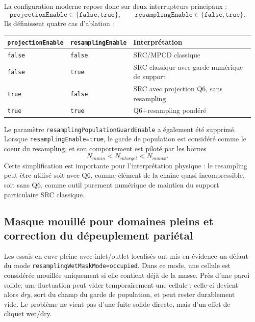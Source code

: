 \documentclass[11pt,a4paper]{article}
\begin{document}
La configuration moderne repose donc sur deux interrupteurs principaux :
\begin{equation}
  \texttt{projectionEnable}\in\{\texttt{false},\texttt{true}\},
  \qquad
  \texttt{resamplingEnable}\in\{\texttt{false},\texttt{true}\}.
\end{equation}
Ils définissent quatre cas d'ablation :
\begin{center}
\begin{tabular}{lll}
\toprule
\texttt{projectionEnable} & \texttt{resamplingEnable} & Interprétation \\
\midrule
\texttt{false} & \texttt{false} & SRC/MPCD classique \\
\texttt{false} & \texttt{true}  & SRC classique avec garde numérique de support \\
\texttt{true}  & \texttt{false} & SRC avec projection Q6, sans resampling \\
\texttt{true}  & \texttt{true}  & Q6+resampling pondéré \\
\bottomrule
\end{tabular}
\end{center}

Le paramètre \texttt{resamplingPopulationGuardEnable} a également été supprimé. Lorsque \texttt{resamplingEnable=true}, le garde de population est considéré comme le coeur du resampling, et son comportement est piloté par les bornes
\begin{equation}
  N_{
m min} < N_{
m target} < N_{
m max}.
\end{equation}
Cette simplification est importante pour l'interprétation physique : le resampling peut être utilisé soit avec Q6, comme élément de la chaîne quasi-incompressible, soit sans Q6, comme outil purement numérique de maintien du support particulaire SRC classique.

\subsection{Masque mouillé pour domaines pleins et correction du dépeuplement pariétal}

Les essais en cuve pleine avec inlet/outlet localisés ont mis en évidence un défaut du mode \texttt{resamplingWetMaskMode=occupied}. Dans ce mode, une cellule est considérée mouillée uniquement si elle contient déjà de la masse. Près d'une paroi solide, une fluctuation peut vider temporairement une cellule ; celle-ci devient alors \emph{dry}, sort du champ du garde de population, et peut rester durablement vide. Le problème ne vient pas d'une fuite solide directe, mais d'un effet de cliquet wet/dry.
\end{document}
